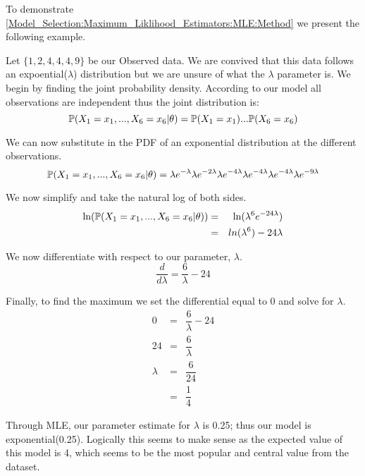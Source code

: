     \begin{example}
        \label{Model_Selection:Maximum_Liklihood_Estimators:MLE:Example}
        To demonstrate \ref{Model_Selection:Maximum_Liklihood_Estimators:MLE:Method} we present the following example. 

        Let $\{1,2,4,4,4,9\}$ be our Observed data. We are convived that this data follows an expoential($\lambda$) distribution but we are unsure of what the $\lambda$ parameter is. We begin by finding the joint probability density. According to our model all observations are independent thus the joint distribution is:
        \begin{equation}
            \mathbb{P}(X_1 = x_1,...,X_6=x_6|\theta) = \mathbb{P}(X_1 = x_1)...\mathbb{P}(X_6 = x_6)
        \end{equation}

        We can now substitute in the PDF of an exponential distribution at the different observations.
        \begin{equation}
            \mathbb{P}(X_1 = x_1,...,X_6=x_6|\theta) = \lambda e^{-\lambda} \lambda e^{-2\lambda} \lambda e^{-4\lambda} \lambda e^{-4\lambda} \lambda e^{-4\lambda} \lambda e^{-9\lambda}
        \end{equation}

        We now simplify and take the natural log of both sides.
        \begin{eqnarray}
            \ln(\mathbb{P}(X_1 = x_1,...,X_6=x_6|\theta)) & = &  \ln(\lambda^6 e^{-24\lambda}) \\
            & = & ln(\lambda^6) - 24\lambda 
        \end{eqnarray}

        We now differentiate with respect to our parameter, $\lambda$.
        \begin{equation}
            \dfrac{d}{d\lambda} = \dfrac{6}{\lambda} - 24
        \end{equation}

        Finally, to find the maximum we set the differential equal to 0 and solve for $\lambda$.
        \begin{eqnarray}
            0 & = & \dfrac{6}{\lambda} - 24 \\
            24 & = & \dfrac{6}{\lambda} \\
            \lambda & = & \dfrac{6}{24} \\
            & = & \dfrac{1}{4}    
        \end{eqnarray}

        Through MLE, our parameter estimate for $\lambda$ is 0.25; thus our model is exponential(0.25). Logically this seems to make sense as the expected value of this model is 4, which seems to be the most popular and central value from the dataset.
    \end{example}


